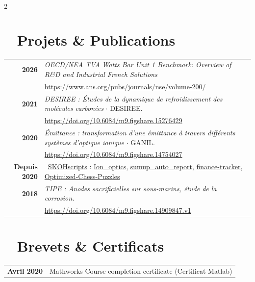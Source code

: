 \documentclass{modernsimplecv}
\newlength{\rightcolwidth}
\begin{document}
\begin{paracol}{2}
\begin{tcolorbox}[boxsep=-1mm, boxrule=0.1mm, boxrule=0mm,colframe=shadecolor,colback=shadecolor]
\begin{minipage}[t]{\rightcolwidth}
			\section*{\faCodeFork ~ Projets \& Publications}
			\begin{tabular}{>{\footnotesize\bfseries}r >{\footnotesize}p{}}
                2026    & \emph{OECD/NEA TVA Watts Bar Unit 1 Benchmark: Overview of R\&D and Industrial French Solutions}\\
                        & \scriptsize\url{https://www.ans.org/pubs/journals/nse/volume-200/}\\
				2021    & \emph{DESIREE : Études de la dynamique de refroidissement des molécules carbonées} $\cdot$ DESIREE.              \\
				            & \scriptsize\url{https://doi.org/10.6084/m9.figshare.15276429}                                                    \\
				2020        & \emph{Émittance : transformation d'une émittance à travers différents systèmes d'optique ionique} $\cdot$ GANIL. \\
				            & \scriptsize\url{https://doi.org/10.6084/m9.figshare.14754027}                                                    \\
				Depuis 2020 & \faGithub~\href{https://github.com/SKOHscripts}{SKOHscripts} : \href{https://github.com/SKOHscripts/Ion_optics}{Ion\_optics}, \href{https://github.com/SKOHscripts/sumup_auto_report}{sumup\_auto\_report}, \href{https://github.com/SKOHscripts/finance-tracker}{finance-tracker}, \href{https://github.com/SKOHscripts/Optimized-Chess-Puzzles}{Optimized-Chess-Puzzles} \\
				2018        & \emph{TIPE : Anodes sacrificielles sur sous-marins, étude de la corrosion.}                                      \\
				            & \scriptsize\url{https://doi.org/10.6084/m9.figshare.14909847.v1}                                                 \\
			\end{tabular}
			\vspace{0.5em}
		\end{minipage}

		\begin{minipage}[t]{\rightcolwidth}
			\section*{\faCertificate ~ Brevets \& Certificats}
			\begin{tabular}{>{\footnotesize\bfseries}r >{\footnotesize}p{}}
				Avril 2020   & Mathworks Course completion certificate (Certificat Matlab)                                              \\


\end{tabular}
\end{minipage}
\end{tcolorbox}
\end{paracol}
\end{document}
